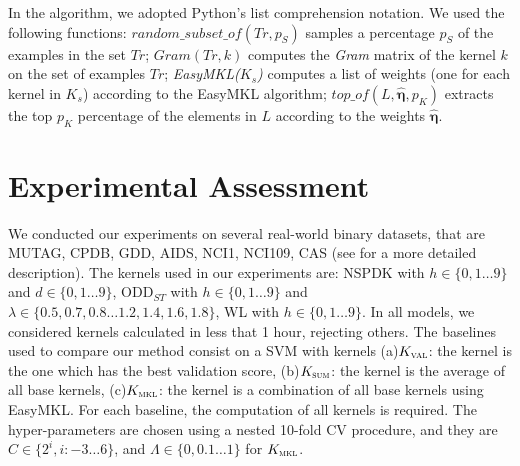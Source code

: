 \documentclass{esannV2}
\newcommand{\1}{{\bf 1}}
\newcommand{\kval}{$K_{\textsc{val}}$}
\newcommand{\ksum}{$K_{\textsc{sum}}$}
\newcommand{\kmkl}{$K_{\textsc{mkl}}$}
\begin{document}
In the algorithm, we adopted Python's list comprehension notation. We used the following functions:  $random\_subset\_of(Tr,p_S)$  samples a percentage $p_S$ of the examples in the set $Tr$; $Gram(Tr,k)$ computes the \textit{Gram} matrix of the kernel $k$ on the set of examples $Tr$; \textit{EasyMKL($K_s$)} computes a list of weights (one for each kernel in $K_s$) according to the EasyMKL algorithm; $top\_of(L,\hat{\boldsymbol{\eta}},p_K)$ extracts the top $p_K$ percentage of the elements in $L$ according to the weights $\hat{\boldsymbol{\eta}}$.
\vspace{-0.5cm}
\section{Experimental Assessment}
We conducted our experiments on several real-world binary datasets, that are MUTAG, CPDB, GDD, AIDS, NCI1, NCI109, CAS (see \cite{DaSanMartino2016,Shervashidze2011} for a more detailed description).
%
The kernels used in our experiments are:  NSPDK  with $h \in \{0,1\dots9\}$ and $d \in \{0,1\dots9\}$,  ODD$_{ST}$ with $h \in \{0,1\dots9\}$ and $\lambda \in \{0.5, 0.7,0.8\dots1.2,1.4,1.6,1.8\}$, WL with $h \in \{0,1\dots9\}$.
In all models, we considered kernels calculated in less that 1 hour, rejecting others.
The baselines used to compare our method consist on a SVM with kernels (a)\kval: the kernel is the one which has the best validation score, (b)\ksum: the kernel is the average of all base kernels, (c)\kmkl: the kernel is a combination of all base kernels using EasyMKL.
For each baseline, the computation of all kernels is required.
The hyper-parameters are chosen using a nested 10-fold CV procedure, and they are $C\in\{2^i, i:-3\dots6\}$, and $\Lambda\in\{0,0.1\dots1\}$ for \kmkl.
%
\end{document}
